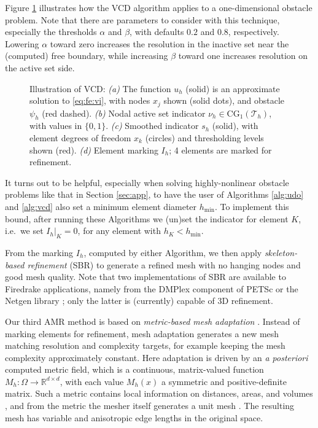 \documentclass[]{interact}
\theoremstyle{plain}%
\theoremstyle{definition}
\theoremstyle{remark}
\newcommand{\RR}{\mathbb{R}}
\newcommand{\cT}{\mathcal{T}}
\newcommand{\CG}{\text{CG}}
\newcommand{\hmin}{h_{\min}}
\begin{document}
Figure \ref{fig:vcdillustration} illustrates how the VCD algorithm applies to a one-dimensional obstacle problem.  Note that there are parameters to consider with this technique, especially the thresholds $\alpha$ and $\beta$, with defaults $0.2$ and $0.8$, respectively.  Lowering $\alpha$ toward zero increases the resolution in the inactive set near the (computed) free boundary, while increasing $\beta$ toward one increases resolution on the active set side.

\begin{figure}[ht]

\caption{Illustration of VCD: \emph{(a)} The function $u_h$ (solid) is an approximate solution to \eqref{eq:fe:vi}, with nodes $x_j$ shown (solid dots), and obstacle $\psi_h$ (red dashed).  \emph{(b)} Nodal active set indicator $\nu_h \in \CG_1(\cT_h)$, with values in $\{0,1\}$.  \emph{(c)} Smoothed indicator $s_h$ (solid), with element degrees of freedom $x_k$ (circles) and thresholding levels shown (red).  \emph{(d)} Element marking $I_h$; 4 elements are marked for refinement.}
\label{fig:vcdillustration}
\end{figure}

It turns out to be helpful, especially when solving highly-nonlinear obstacle problems like that in Section \ref{sec:app}, to have the user of Algorithms \ref{alg:udo} and \ref{alg:vcd} also set a minimum element diameter $\hmin$.  To implement this bound, after running these Algorithms we (un)set the indicator for element $K$, i.e.~we set $I_h|_K=0$, for any element with $h_K < \hmin$.

From the marking $I_h$, computed by either Algorithm, we then apply \emph{skeleton-based refinement} (SBR) \cite{PlazaCarey2000} to generate a refined mesh with no hanging nodes and good mesh quality.  Note that two implementations of SBR are available to Firedrake applications, namely from the DMPlex component of PETSc \cite{petsc-user-ref} or the Netgen library \cite{Betteridgeetal2024}; only the latter is (currently) capable of 3D refinement.

Our third AMR method is based on \emph{metric-based mesh adaptation} \cite{Alauzet2010}.  Instead of marking elements for refinement, mesh adaptation generates a new mesh matching resolution and complexity targets, for example keeping the mesh complexity approximately constant.  Here adaptation is driven by an \emph{a posteriori} computed metric ﬁeld, which is a continuous, matrix-valued function $M_h:\Omega \to \RR^{d\times d}$, with each value $M_h(x)$ a symmetric and positive-definite matrix.  Such a metric contains local information on distances, areas, and volumes \cite{LoseilleAlauzet2011}, and from the metric the mesher itself generates a unit mesh \cite{Alauzet2010}.  The resulting mesh has variable and anisotropic edge lengths in the original space.
\end{document}
